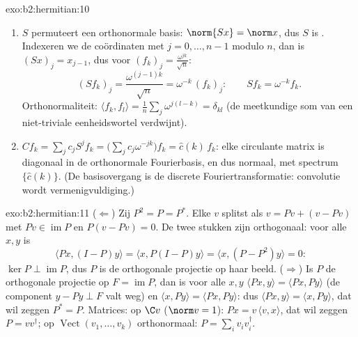 \begin{solution}{exo:b2:hermitian:10}
\begin{enumerate}
  \item $S$ permuteert een orthonormale basis: $\norm{Sx} = \norm
        x$, dus $S$ is . Indexeren we de coördinaten met
        $j = 0, \dots, n-1$ modulo $n$, dan is $(Sx)_j =
        x_{j-1}$, dus voor $(f_k)_j = \frac{\omega^{jk}}{\sqrt
        n}$:
        \[
        (Sf_k)_j = \frac{\omega^{(j-1)k}}{\sqrt n}
        = \omega^{-k}\,(f_k)_j :
        \qquad Sf_k = \omega^{-k}f_k .
        \]
        Orthonormaliteit: $\langle f_k, f_l\rangle = \frac1n
        \sum_j \omega^{j(l-k)} = \delta_{kl}$ (de meetkundige som
        van een niet-triviale eenheidswortel verdwijnt).
  \item $Cf_k = \sum_j c_j S^jf_k = \bigl(\sum_j
        c_j\omega^{-jk}\bigr)f_k = \widehat c(k)\,f_k$: elke
        circulante matrix is diagonaal in de orthonormale
        Fourierbasis, en dus normaal, met spectrum $\{\widehat
        c(k)\}$. (De basisovergang is de discrete
        Fouriertransformatie: convolutie wordt
        vermenigvuldiging.)
\end{enumerate}
\end{solution}

\begin{solution}{exo:b2:hermitian:11}
($\Leftarrow$) Zij $P^2 = P = P^*$. Elke $v$ splitst als $v = Pv +
(v - Pv)$ met $Pv \in \operatorname{im} P$ en $P(v - Pv) = 0$. De
twee stukken zijn orthogonaal: voor alle $x, y$ is
\[
\langle Px, (I - P)y\rangle = \langle x, P(I-P)y\rangle
= \langle x, (P - P^2)y\rangle = 0 :
\]
$\ker P \perp \operatorname{im} P$, dus $P$ is de orthogonale
projectie op haar beeld. ($\Rightarrow$) Is $P$ de orthogonale
projectie op $F = \operatorname{im}P$, dan is voor alle $x, y$
$\langle Px, y\rangle = \langle Px, Py\rangle$ (de component $y -
Py \perp F$ valt weg) en  $\langle x, Py\rangle =
\langle Px, Py\rangle$: dus $\langle Px, y\rangle = \langle x,
Py\rangle$, dat wil zeggen $P^* = P$. Matrices: op $\C v$ ($\norm v
= 1$): $Px = v\,\langle v, x\rangle$, dat wil zeggen $P =
vv^\dagger$; op $\operatorname{Vect}(v_1, \dots, v_k)$
orthonormaal: $P = \sum_i v_iv_i^\dagger$.
\end{solution}

